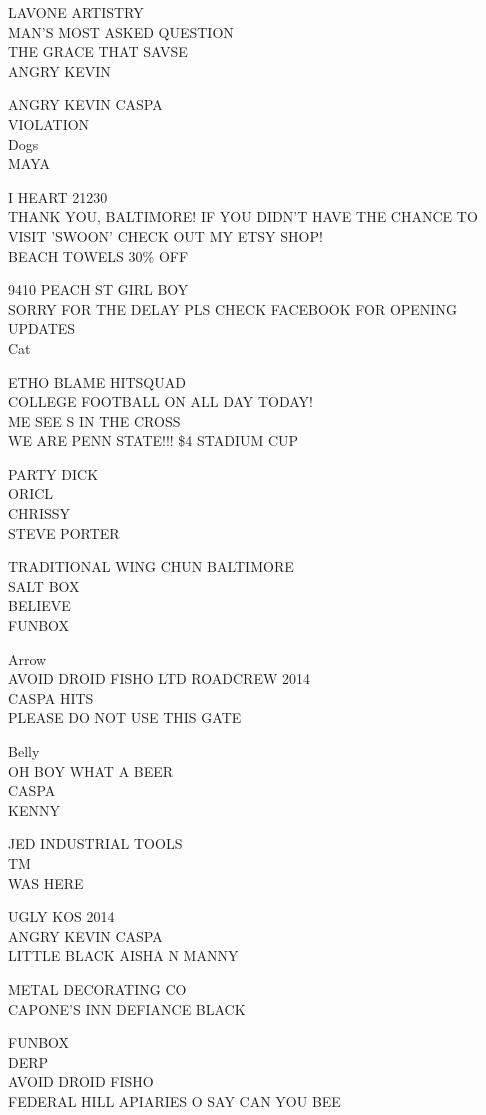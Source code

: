 \documentclass[10pt,letterpaper]{article}
\begin{document}
LAVONE ARTISTRY\\
MAN'S MOST ASKED QUESTION\\
THE GRACE THAT SAVSE\\
ANGRY KEVIN

ANGRY KEVIN CASPA\\
VIOLATION\\
Dogs\\
MAYA

I HEART 21230\\
THANK YOU, BALTIMORE!  IF YOU DIDN'T HAVE THE CHANCE TO VISIT 'SWOON' CHECK OUT MY ETSY SHOP!\\
BEACH TOWELS 30\% OFF

9410 PEACH ST GIRL BOY\\
SORRY FOR THE DELAY PLS CHECK FACEBOOK FOR OPENING UPDATES\\
Cat

ETHO BLAME HITSQUAD\\
COLLEGE FOOTBALL ON ALL DAY TODAY!\\
ME SEE S IN THE CROSS\\
WE ARE PENN STATE!!! \$4 STADIUM CUP

PARTY DICK\\
ORICL\\
CHRISSY\\
STEVE PORTER

TRADITIONAL WING CHUN BALTIMORE\\
SALT BOX\\
BELIEVE\\
FUNBOX

Arrow\\
AVOID DROID FISHO LTD ROADCREW 2014\\
CASPA HITS\\
PLEASE DO NOT USE THIS GATE

Belly\\
OH BOY WHAT A BEER\\
CASPA\\
KENNY

JED INDUSTRIAL TOOLS\\
TM\\
WAS HERE

UGLY KOS 2014\\
ANGRY KEVIN CASPA\\
LITTLE BLACK AISHA N MANNY

METAL DECORATING CO\\
CAPONE'S INN DEFIANCE BLACK

FUNBOX\\
DERP\\
AVOID DROID FISHO\\
FEDERAL HILL APIARIES O SAY CAN YOU BEE
\end{document}
